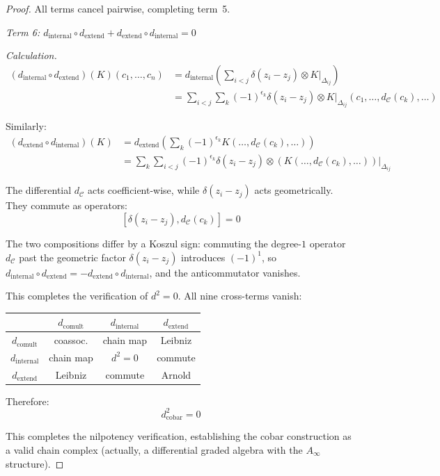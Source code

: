 \begin{proof}
All terms cancel pairwise, completing term~5.

\emph{Term 6: $d_{\text{internal}} \circ d_{\text{extend}} + d_{\text{extend}} 
\circ d_{\text{internal}} = 0$}

\emph{Calculation.}
\begin{align*}
(d_{\text{internal}} \circ d_{\text{extend}})(K)(c_1, \ldots, c_n) &= 
d_{\text{internal}}\left(\sum_{i<j} \delta(z_i - z_j) \otimes K|_{\Delta_{ij}}\right) \\
&= \sum_{i<j} \sum_k (-1)^{\epsilon_k} \delta(z_i - z_j) \otimes 
K|_{\Delta_{ij}}(c_1, \ldots, d_{\mathcal{C}}(c_k), \ldots)
\end{align*}

Similarly:
\begin{align*}
(d_{\text{extend}} \circ d_{\text{internal}})(K) &= d_{\text{extend}}\left(\sum_k 
(-1)^{\epsilon_k} K(\ldots, d_{\mathcal{C}}(c_k), \ldots)\right) \\
&= \sum_k \sum_{i<j} (-1)^{\epsilon_k} \delta(z_i - z_j) \otimes 
(K(\ldots, d_{\mathcal{C}}(c_k), \ldots))|_{\Delta_{ij}}
\end{align*}

The differential $d_{\mathcal{C}}$ acts coefficient-wise,
while $\delta(z_i - z_j)$ acts geometrically. They commute as operators:
\[[\delta(z_i - z_j), d_{\mathcal{C}}(c_k)] = 0\]

The two compositions differ by a Koszul sign: commuting the degree-$1$ operator $d_{\mathcal{C}}$ past the geometric factor $\delta(z_i - z_j)$ introduces $(-1)^1$, so $d_{\mathrm{internal}} \circ d_{\mathrm{extend}} = -d_{\mathrm{extend}} \circ d_{\mathrm{internal}}$, and the anticommutator vanishes.

This completes the verification of $d^2 = 0$. All nine cross-terms vanish:
\begin{center}
\begin{tabular}{c|ccc}
& $d_{\text{comult}}$ & $d_{\text{internal}}$ & $d_{\text{extend}}$ \\ \hline
$d_{\text{comult}}$ & coassoc. & chain map & Leibniz \\
$d_{\text{internal}}$ & chain map & $d^2=0$ & commute \\
$d_{\text{extend}}$ & Leibniz & commute & Arnold \\
\end{tabular}
\end{center}

Therefore:
\[d_{\text{cobar}}^2 = 0\]

This completes the nilpotency verification, establishing the cobar construction 
as a valid chain complex (actually, a differential graded algebra with the 
$A_\infty$ structure).
\end{proof}

